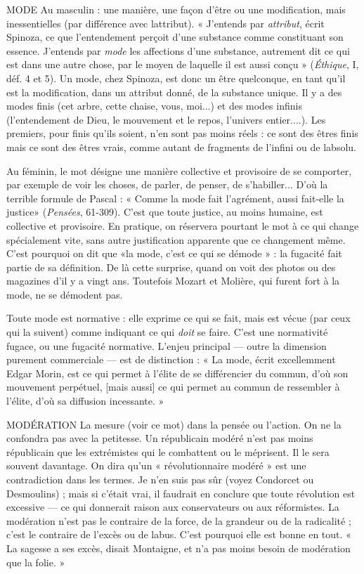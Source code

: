 MODE Au masculin : une manière, une façon d’être ou une modification,
mais inessentielles (par différence avec lattribut). « J'entends par
{\it attribut}, écrit Spinoza, ce que l’entendement perçoit d’une substance comme
constituant son essence. J'entends par {\it mode} les affections d’une substance,
autrement dit ce qui est dans une autre chose, par le moyen de laquelle il est
aussi conçu » ({\it Éthique}, I, déf. 4 et 5). Un mode, chez Spinoza, est donc un être
quelconque, en tant qu’il est la modification, dans un attribut donné, de la
substance unique. Il y a des modes finis (cet arbre, cette chaise, vous, moi...) et
des modes infinis (l’entendement de Dieu, le mouvement et le repos, l'univers
entier....). Les premiers, pour finis qu’ils soient, n’en sont pas moins réels : ce
sont des êtres finis mais ce sont des êtres vrais, comme autant de fragments de
l'infini ou de labsolu.

Au féminin, le mot désigne une manière collective et provisoire de se comporter,
par exemple de voir les choses, de parler, de penser, de s’habiller...
D'où la terrible formule de Pascal : « Comme la mode fait l’agrément, aussi
fait-elle la justice» ({\it Pensées}, 61-309). C’est que toute justice, au moins
humaine, est collective et provisoire. En pratique, on réservera pourtant le mot
à ce qui change spécialement vite, sans autre justification apparente que ce
changement même. C’est pourquoi on dit que «la mode, c’est ce qui se
démode » : la fugacité fait partie de sa définition. De là cette surprise, quand on
voit des photos ou des magazines d'il y a vingt ans. Toutefois Mozart et
Molière, qui furent fort à la mode, ne se démodent pas.

Toute mode est normative : elle exprime ce qui se fait, mais est vécue (par
ceux qui la suivent) comme indiquant ce qui {\it doit} se faire. C’est une normativité
fugace, ou une fugacité normative. L'enjeu principal — outre la dimension
purement commerciale — est de distinction : « La mode, écrit excellemment
Edgar Morin, est ce qui permet à l'élite de se différencier du commun, d’où son
mouvement perpétuel, [mais aussi] ce qui permet au commun de ressembler à
l'élite, d’où sa diffusion incessante. »

MODÉRATION La mesure (voir ce mot) dans la pensée ou l’action. On ne
la confondra pas avec la petitesse. Un républicain modéré
n’est pas moins républicain que les extrémistes qui le combattent ou le méprisent.
Il le sera souvent davantage. On dira qu’un « révolutionnaire modéré » est
une contradiction dans les termes. Je n’en suis pas sûr (voyez Condorcet ou
Desmoulins) ; mais si c'était vrai, il faudrait en conclure que toute révolution
est excessive — ce qui donnerait raison aux conservateurs ou aux réformistes.
La modération n’est pas le contraire de la force, de la grandeur ou de la
radicalité ; c’est le contraire de l'excès ou de labus. C’est pourquoi elle est
bonne en tout. « La sagesse a ses excès, disait Montaigne, et n’a pas moins
besoin de modération que la folie. »

